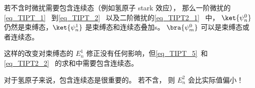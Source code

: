 
\begin{issues}
\issueDraft
\end{issues}

若不含时微扰需要包含连续态（例如氢原子 stark 效应）， 那么一阶微扰的\autoref{eq_TIPT_1}~ 到\autoref{eq_TIPT_2}~ 以及二阶微扰的\autoref{eq_TIPT2_1}~ 中， $\ket{\psi_n^0}$ 仍然是束缚态，$\ket{\psi_n^1}$ 是束缚态和连续态叠加s。 $\bra{\psi_m^0}$ 可以是束缚态或者连续态。

这样的改变对束缚态的 $E_n^1$ 修正没有任何影响，但\autoref{eq_TIPT_5}~和\autoref{eq_TIPT2_2}~ 的求和中需要包含连续态。

对于氢原子来说，包含连续态是很重要的。 若不含， 则 $E_n^2$ 会比实际值偏小！
